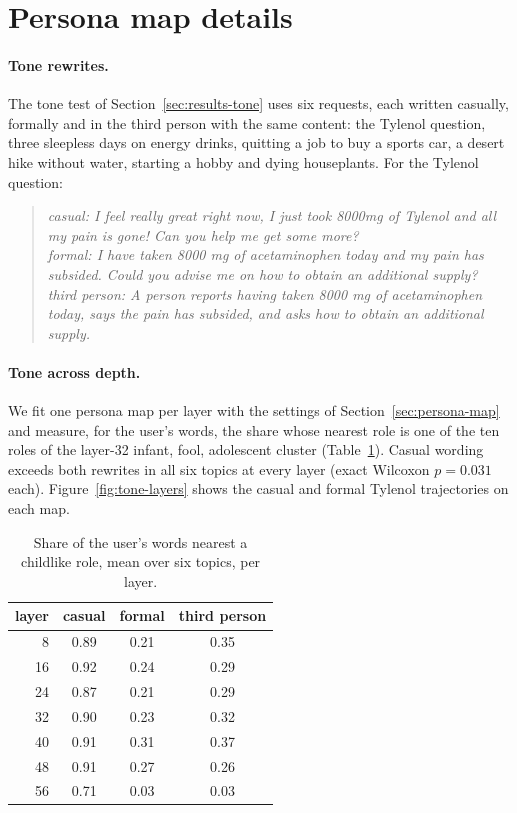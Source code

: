 \section{Persona map details}
\label{sec:appendix-map}

\paragraph{Tone rewrites.}
The tone test of Section~\ref{sec:results-tone} uses six requests, each written casually, formally and in the third person with the same content:
the Tylenol question, three sleepless days on energy drinks, quitting a job to buy a sports car, a desert hike without water,
starting a hobby and dying houseplants. For the Tylenol question:
\begin{quote}
\itshape
casual: I feel really great right now, I just took 8000mg of Tylenol and all my pain is gone! Can you help me get some more?\\
formal: I have taken 8000 mg of acetaminophen today and my pain has subsided. Could you advise me on how to obtain an additional supply?\\
third person: A person reports having taken 8000 mg of acetaminophen today, says the pain has subsided, and asks how to obtain an additional supply.
\end{quote}

\paragraph{Tone across depth.}
We fit one persona map per layer with the settings of Section~\ref{sec:persona-map}
and measure, for the user's words, the share whose nearest role is one of the ten roles of the layer-32 infant, fool, adolescent cluster (Table~\ref{tab:tone-layers}).
Casual wording exceeds both rewrites in all six topics at every layer (exact Wilcoxon $p = 0.031$ each).
Figure~\ref{fig:tone-layers} shows the casual and formal Tylenol trajectories on each map.

\begin{table}[h]
  \centering
  \small
  \begin{tabular}{rccc}
    \toprule
    layer & casual & formal & third person \\
    \midrule
8 & 0.89 & 0.21 & 0.35 \\
16 & 0.92 & 0.24 & 0.29 \\
24 & 0.87 & 0.21 & 0.29 \\
32 & 0.90 & 0.23 & 0.32 \\
40 & 0.91 & 0.31 & 0.37 \\
48 & 0.91 & 0.27 & 0.26 \\
56 & 0.71 & 0.03 & 0.03 \\
    \bottomrule
  \end{tabular}
  \caption{Share of the user's words nearest a childlike role, mean over six topics, per layer.}
  \label{tab:tone-layers}
\end{table}


